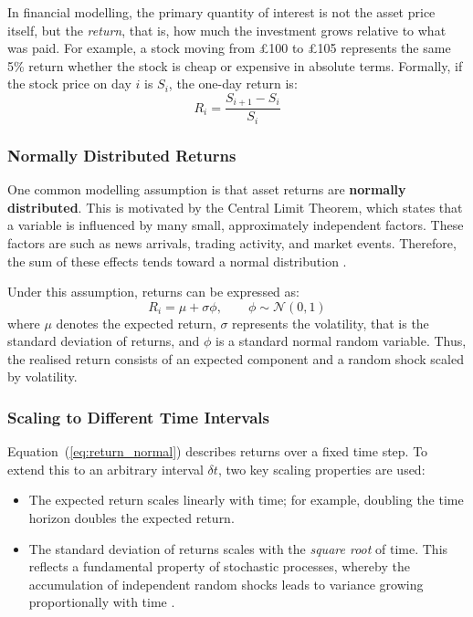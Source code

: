 \documentclass[12pt]{article}
\begin{document}
In financial modelling, the primary quantity of interest is not the asset price itself, but the \textit{return}, that is, how much the investment grows relative to what was paid. For example, a stock moving from \pounds100 to \pounds105 represents the same 5\% return whether the stock is cheap or expensive in absolute terms. Formally, if the stock price on day $i$ is $S_i$, the one-day return is:
\begin{equation}
  R_i = \frac{S_{i+1} - S_i}{S_i}
  \label{eq:return}
\end{equation}

\subsubsection{Normally Distributed Returns}

One common modelling assumption is that asset returns are \textbf{normally distributed}. This is motivated by the Central Limit Theorem, which states that a variable is influenced by many small, approximately independent factors. These factors are such as news arrivals, trading activity, and market events. Therefore, the sum of these effects tends toward a normal distribution \cite{degroot2012probability}.

Under this assumption, returns can be expressed as:
\begin{equation}
  R_i = \mu + \sigma \phi, \qquad \phi \sim \mathcal{N}(0,1)
  \label{eq:return_normal}
\end{equation}
where $\mu$ denotes the expected return, $\sigma$ represents the volatility, that is the standard deviation of returns, and $\phi$ is a standard normal random variable. Thus, the realised return consists of an expected component and a random shock scaled by volatility.

\subsubsection{Scaling to Different Time Intervals}

Equation~(\ref{eq:return_normal}) describes returns over a fixed time step. To extend this to an arbitrary interval $\delta t$, two key scaling properties are used:

\begin{itemize}[leftmargin=2em, itemsep=2pt]
\item The expected return scales linearly with time; for example, doubling the time horizon doubles the expected return.
\item The standard deviation of returns scales with the \textit{square root} of time. This reflects a fundamental property of stochastic processes, whereby the accumulation of independent random shocks leads to variance growing proportionally with time \cite{shreve2004stochastic}.
\end{itemize}
\end{document}
